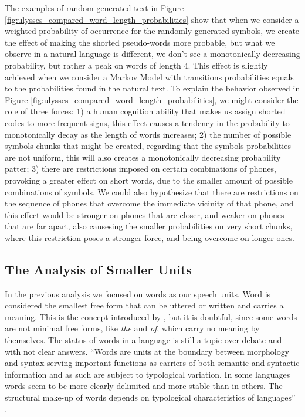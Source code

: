 The examples of random generated text in Figure \ref{fig:ulysses_compared_word_length_probabilities}
show that when we consider a weighted probability of occurrence for the randomly generated symbols,
we create the effect of making the shorted pseudo-words more probable, but what we observe in a
natural language is different, we don't see a monotonically decreasing probability, but rather
a peak on words of length $4$. This effect is slightly achieved when we consider a Markov Model with
transitions probabilities equals to the probabilities found in the natural text.
To explain the behavior observed in Figure \ref{fig:ulysses_compared_word_length_probabilities}, we 
might consider the role of three forces: 1) a human cognition ability that makes us assign
shorted codes to more frequent signs, this effect causes a tendency in the probability to 
monotonically decay as the length of words increases; 2) the number of possible symbols chunks that
might be created, regarding that the symbols probabilities are not uniform, this will also 
creates a monotonically decreasing probability patter; 3) there are restrictions imposed on
certain combinations of phones, provoking a greater effect on short words, due to the smaller
amount of possible combinations of symbols. We could also hypothesize that there are restrictions
on the sequence of phones that overcome the immediate vicinity of that phone, and this effect 
would be stronger on phones that are closer, and weaker on phones that are far apart, 
also causesing the smaller probabilities on very
short chunks, where this restriction poses a stronger force, and being overcome on longer ones.







\subsection{The Analysis of Smaller Units}
\label{sec:smaller_units}
In the previous analysis we focused on words as our speech units.
Word is considered the smallest free form that can be uttered or written and carries a meaning.
This is the concept introduced by \citet{bloomfield1926}, but it is doubtful, since some words are not
minimal free forms, like \textit{the} and \textit{of}, which carry no meaning by themselves.
The status of words in a language is still a topic over debate and with not clear answers.
``Words are units at the boundary between morphology and syntax serving important functions as carriers of both semantic and syntactic information and as such are subject to typological variation. In some languages words seem to be more clearly delimited and more stable than in others. The structural make-up of words depends on typological characteristics of languages'' \citep{coulmas}.


